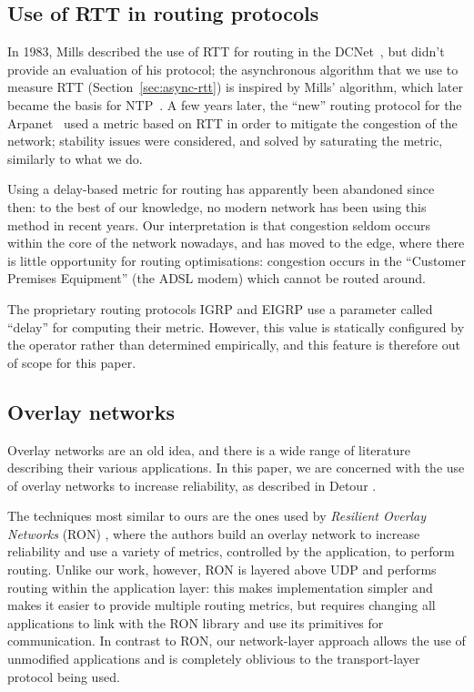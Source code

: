 \documentclass[conference,letterpaper]{IEEEtran}
\begin{document}
\subsection{Use of RTT in routing protocols}

In 1983, Mills described the use of RTT for routing in the
DCNet~\cite{mills83}, but didn't provide an evaluation of his
protocol; the asynchronous algorithm that we use to measure RTT
(Section~\ref{sec:async-rtt}) is inspired by Mills' algorithm, which
later became the basis for NTP~\cite{NTPv4}.  A few years later, the
``new'' routing protocol for the Arpanet~\cite{arpanet89} used
a metric based on RTT in order to mitigate the congestion of the
network; stability issues were considered, and solved by saturating
the metric, similarly to what we do.

Using a delay-based metric for routing has apparently been abandoned
since then: to the best of our knowledge, no modern network has been
using this method in recent years.  Our interpretation is that
congestion seldom occurs within the core of the network nowadays, and
has moved to the edge, where there is little opportunity for routing
optimisations: congestion occurs in the ``Customer Premises
Equipment'' (the ADSL modem) which cannot be routed around.

The proprietary routing protocols IGRP and EIGRP use a parameter
called ``delay'' for computing their metric.  However, this value is
statically configured by the operator rather than determined
empirically, and this feature is therefore out of scope for this
paper.

\subsection{Overlay networks}

Overlay networks are an old idea, and there is a wide range of
literature describing their various applications.  In this paper, we
are concerned with the use of overlay networks to increase
reliability, as described in Detour \cite{detour}.

The techniques most similar to ours are the ones used by
\emph{Resilient Overlay Networks} (RON) \cite{ron}, where the authors
build an overlay network to increase reliability and use a variety of
metrics, controlled by the application, to perform routing.  Unlike
our work, however, RON is layered above UDP and performs routing within
the application layer: this makes implementation simpler and makes it
easier to provide multiple routing metrics, but requires changing all
applications to link with the RON library and use its primitives for
communication.  In contrast to RON, our network-layer approach allows
the use of unmodified applications and is completely oblivious to the
transport-layer protocol being used.
\end{document}
